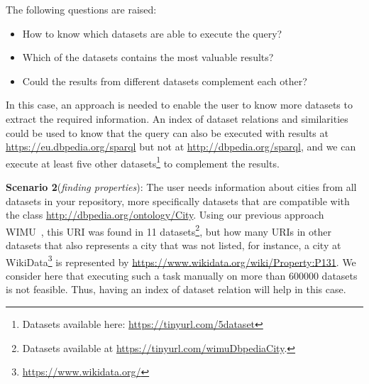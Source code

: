 \documentclass[sw]{iosart2x}
\begin{document}
The following questions are raised:
\begin{itemize}
    \item How to know which datasets are able to execute the query?
    \item Which of the datasets contains the most valuable results?
    \item Could the results from different datasets complement each other?
\end{itemize}

In this case, an approach is needed to enable the user to know more datasets to extract the required information.
An index of dataset relations and similarities could be used to know that the query can also be executed with results at \url{https://eu.dbpedia.org/sparql} but not at \url{http://dbpedia.org/sparql}, and we can execute at least five other datasets\footnote{Datasets available here: \url{https://tinyurl.com/5dataset}} to complement the results.

\textbf{Scenario 2}(\emph{finding properties}): The user needs information about cities from all datasets in your repository, more specifically datasets that are compatible with the class \url{http://dbpedia.org/ontology/City}.
Using our previous approach WIMU~\cite{valdestilhas2018my}, this URI was found in 11 datasets\footnote{Datasets available at \url{https://tinyurl.com/wimuDbpediaCity}.}, but how many URIs in other datasets that also represents a city that was not listed, for instance, a city at WikiData\footnote{\url{https://www.wikidata.org/}} is represented by  \url{https://www.wikidata.org/wiki/Property:P131}.
We consider here that executing such a task manually on more than \num{600000} datasets is not feasible.
Thus, having an index of dataset relation will help in this case.
\end{document}
